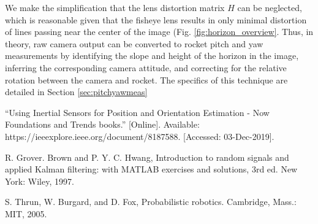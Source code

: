 \documentclass{article}
\begin{document}
We make the simplification that the lens distortion matrix $H$ can be neglected, which is reasonable given that the fisheye lens results in only minimal distortion of lines passing near the center of the image (Fig. \ref{fig:horizon_overview}. Thus, in theory, raw camera output can be converted to rocket pitch and yaw measurements by identifying the slope and height of the horizon in the image, inferring the corresponding camera attitude, and correcting for the relative rotation between the camera and rocket. The specifics of this technique are detailed in Section \ref{sec:pitchyawmeas}

\begin{thebibliography}{9}
“Using Inertial Sensors for Position and Orientation Estimation - Now Foundations and Trends books.” [Online]. Available: https://ieeexplore.ieee.org/document/8187588. [Accessed: 03-Dec-2019].

R. Grover. Brown and P. Y. C. Hwang, Introduction to random signals and applied Kalman filtering: with MATLAB exercises and solutions, 3rd ed. New York: Wiley, 1997.

S. Thrun, W. Burgard, and D. Fox, Probabilistic robotics. Cambridge, Mass.: MIT, 2005.

\end{thebibliography}
\end{document}

